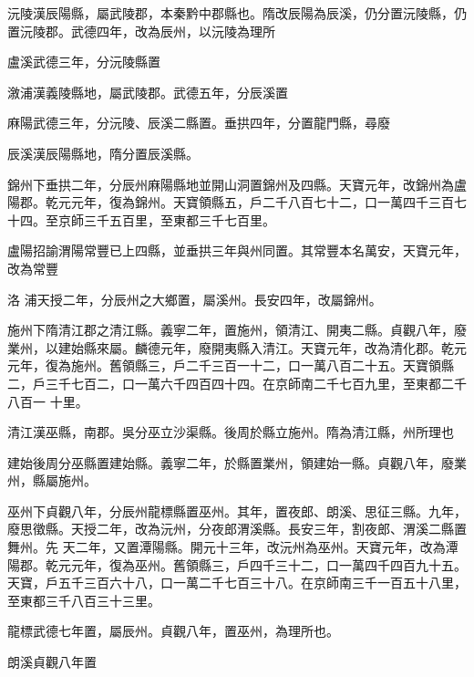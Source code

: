 \begin{pinyinscope}
 沅陵漢辰陽縣，屬武陵郡，本秦黔中郡縣也。隋改辰陽為辰溪，仍分置沅陵縣，仍置沅陵郡。武德四年，改為辰州，以沅陵為理所



 盧溪武德三年，分沅陵縣置



 漵浦漢義陵縣地，屬武陵郡。武德五年，分辰溪置



 麻陽武德三年，分沅陵、辰溪二縣置。垂拱四年，分置龍門縣，尋廢



 辰溪漢辰陽縣地，隋分置辰溪縣。



 錦州下垂拱二年，分辰州麻陽縣地並開山洞置錦州及四縣。天寶元年，改錦州為盧陽郡。乾元元年，復為錦州。天寶領縣五，戶二千八百七十二，口一萬四千三百七十四。至京師三千五百里，至東都三千七百里。



 盧陽招諭渭陽常豐已上四縣，並垂拱三年與州同置。其常豐本名萬安，天寶元年，改為常豐



 洛
 浦天授二年，分辰州之大鄉置，屬溪州。長安四年，改屬錦州。



 施州下隋清江郡之清江縣。義寧二年，置施州，領清江、開夷二縣。貞觀八年，廢業州，以建始縣來屬。麟德元年，廢開夷縣入清江。天寶元年，改為清化郡。乾元元年，復為施州。舊領縣三，戶二千三百一十二，口一萬八百二十五。天寶領縣二，戶三千七百二，口一萬六千四百四十四。在京師南二千七百九里，至東都二千八百一
 十里。



 清江漢巫縣，南郡。吳分巫立沙渠縣。後周於縣立施州。隋為清江縣，州所理也



 建始後周分巫縣置建始縣。義寧二年，於縣置業州，領建始一縣。貞觀八年，廢業州，縣屬施州。



 巫州下貞觀八年，分辰州龍標縣置巫州。其年，置夜郎、朗溪、思征三縣。九年，廢思徵縣。天授二年，改為沅州，分夜郎渭溪縣。長安三年，割夜郎、渭溪二縣置舞州。先
 天二年，又置潭陽縣。開元十三年，改沅州為巫州。天寶元年，改為潭陽郡。乾元元年，復為巫州。舊領縣三，戶四千三十二，口一萬四千四百九十五。天寶，戶五千三百六十八，口一萬二千七百三十八。在京師南三千一百五十八里，至東都三千八百三十三里。



 龍標武德七年置，屬辰州。貞觀八年，置巫州，為理所也。



 朗溪貞觀八年置




\end{pinyinscope}
